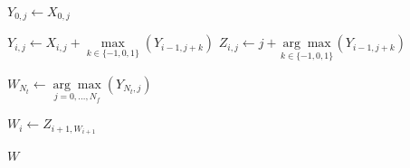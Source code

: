 \documentclass[paper-main.tex]{subfiles}
\begin{document}
\begin{algorithmic}

		\State $Y_{0,j} \gets X_{0,j}$
    \EndFor

		
	    	\State $Y_{i,j} \gets X_{i,j} + \underset{k \in \{-1,0,1\}}{\max} (Y_{i-1,j+k})$
	    	\State $Z_{i,j} \gets j + \underset{k \in \{-1,0,1\}}{\arg\max} (Y_{i-1,j+k})$
   
	    \EndFor
    \EndFor

    \State $W_{N_t} \gets \underset{j=0,\ldots,N_f}{\arg\max} (Y_{N_t,j})$


		\State $W_i \gets Z_{i+1, W_{i+1}}$

    \EndFor    

    \State \Return $W$
\EndFunction
\end{algorithmic}



\end{document}

